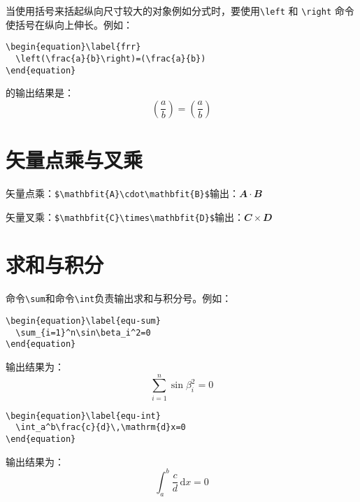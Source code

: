 当使用括号来括起纵向尺寸较大的对象例如分式时，要使用\verb|\left| 和
\verb|\right| 命令使括号在纵向上伸长。例如：
\begin{verbatim}
\begin{equation}\label{frr}
  \left(\frac{a}{b}\right)=(\frac{a}{b})
\end{equation}
\end{verbatim}
的输出结果是：
\begin{equation}\label{frr}
\left(\frac{a}{b}\right)=(\frac{a}{b})
\end{equation}

\section{矢量点乘与叉乘}
矢量点乘：\verb|$\mathbfit{A}\cdot\mathbfit{B}$|输出：$\mathbfit{A}\cdot\mathbfit{B}$

矢量叉乘：\verb|$\mathbfit{C}\times\mathbfit{D}$|输出：$\mathbfit{C}\times\mathbfit{D}$

\section{求和与积分}
命令\verb|\sum|和命令\verb|\int|负责输出求和与积分号。例如：
\begin{verbatim}
\begin{equation}\label{equ-sum}
  \sum_{i=1}^n\sin\beta_i^2=0
\end{equation}
\end{verbatim}
输出结果为：
\begin{equation}\label{equ-sum}
\sum_{i=1}^n\sin\beta_i^2=0
\end{equation}
\begin{verbatim}
\begin{equation}\label{equ-int}
  \int_a^b\frac{c}{d}\,\mathrm{d}x=0
\end{equation}
\end{verbatim}
输出结果为：
\begin{equation}\label{equ-int}
  \int_a^b\frac{c}{d}\,\mathrm{d}x=0
\end{equation}



